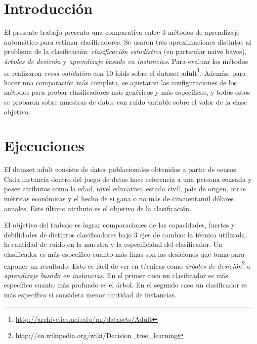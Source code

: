 \documentclass[a4paper,10pt]{article}
\begin{document}



\maketitle
\tableofcontents
\newpage

\section{Introducción}

El presente trabajo presenta una comparativa entre 3 métodos de aprendizaje automático para estimar clasificadores. Se usaron tres aproximaciones distintas al problema de la clasificación: \emph{clasificación estadística} (en particular \textsf{naive bayes}), \emph{árboles de desición} y \emph{aprendizaje basado en instancias}. Para evaluar los métodos se realizaron \emph{cross-validation} con 10 folds sobre el dataset \textsf{adult}\footnote{\url{http://archive.ics.uci.edu/ml/datasets/Adult}}. Además, para hacer una comparación más completa, se ajustaron las configuraciones de los métodos para probar clasificadores más genéricos y más específicos, y todos estos se probaron sobre muestras de datos con ruido variable sobre el valor de la clase objetivo. 

\section{Ejecuciones}

El dataset \textsf{adult} consiste de datos poblacionales obtenidos a partir de censos. Cada instancia dentro del juego de datos hace referencia a una persona censada y posee atributos como la edad, nivel educativo, estado civíl, país de origen, otras métricas económicas y el hecho de si gana o no más de cincuentamil dólares anuales. Este último atributo es el objetivo de la clasificación.

El objetivo del trabajo es lograr comparaciones de las capacidades, fuertes y debilidades de distintos clasificadores bajo 3 ejes de cambio: la técnica utilizada, la cantidad de ruido en la muestra y la especificidad del clasificador. Un clasificador es más específico cuanto más finas son las desiciones que toma para exponer un resultado. Esto es fácil de ver en técnicas como \emph{árboles de desición}\footnote{http://en.wikipedia.org/wiki/Decision\_tree\_learning} o \emph{aprendizaje basado en instancias}. En el primer caso un clasificador es más específico cuanto más profundo es el árbol. En el segundo caso un clasificador es más específico si considera menor cantidad de instancias.
\end{document}
